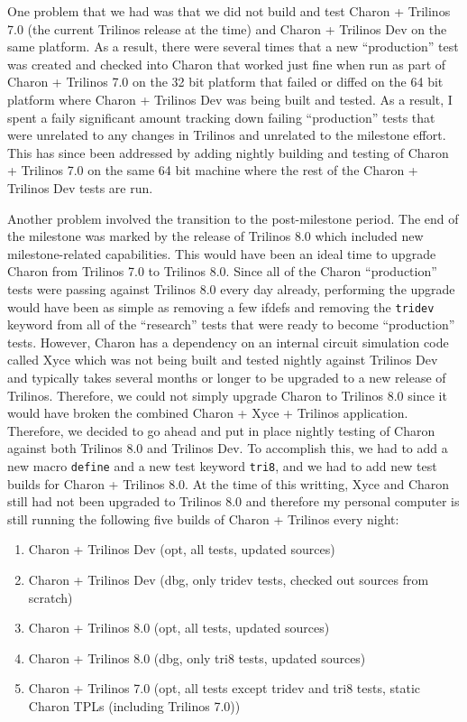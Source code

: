 \documentclass[pdf,ps2pdf,11pt]{SANDreport}
\begin{document}
One problem that we had was that we did not build and test Charon + Trilinos
7.0 (the current Trilinos release at the time) and Charon + Trilinos Dev on
the same platform.  As a result, there were several times that a new
``production'' test was created and checked into Charon that worked just fine
when run as part of Charon + Trilinos 7.0 on the 32 bit platform that failed
or diffed on the 64 bit platform where Charon + Trilinos Dev was being built
and tested.  As a result, I spent a faily significant amount tracking down
failing ``production'' tests that were unrelated to any changes in Trilinos
and unrelated to the milestone effort.  This has since been addressed by
adding nightly building and testing of Charon + Trilinos 7.0 on the same 64
bit machine where the rest of the Charon + Trilinos Dev tests are run.

Another problem involved the transition to the post-milestone period.  The end
of the milestone was marked by the release of Trilinos 8.0 which included new
milestone-related capabilities.  This would have been an ideal time to upgrade
Charon from Trilinos 7.0 to Trilinos 8.0.  Since all of the Charon
``production'' tests were passing against Trilinos 8.0 every day already,
performing the upgrade would have been as simple as removing a few ifdefs and
removing the {}\texttt{tridev} keyword from all of the ``research'' tests that
were ready to become ``production'' tests.  However, Charon has a dependency
on an internal circuit simulation code called Xyce which was not being built
and tested nightly against Trilinos Dev and typically takes several months or
longer to be upgraded to a new release of Trilinos.  Therefore, we could not
simply upgrade Charon to Trilinos 8.0 since it would have broken the combined
Charon + Xyce + Trilinos application.  Therefore, we decided to go ahead and
put in place nightly testing of Charon against both Trilinos 8.0 and Trilinos
Dev.  To accomplish this, we had to add a new macro {}\texttt{define} and a
new test keyword {}\texttt{tri8}, and we had to add new test builds for Charon
+ Trilinos 8.0.  At the time of this writting, Xyce and Charon still had not
been upgraded to Trilinos 8.0 and therefore my personal computer is still
running the following five builds of Charon + Trilinos every night:

\begin{enumerate}
%
{}\item Charon + Trilinos Dev (opt, all tests, updated sources)
%
{}\item Charon + Trilinos Dev (dbg, only tridev tests, checked out sources
from scratch)
%
{}\item Charon + Trilinos 8.0 (opt, all tests, updated sources)
%
{}\item Charon + Trilinos 8.0 (dbg, only tri8 tests, updated sources)
%
{}\item Charon + Trilinos 7.0 (opt, all tests except tridev and tri8 tests,
static Charon TPLs (including Trilinos 7.0))
%
\end{enumerate}
\end{document}
